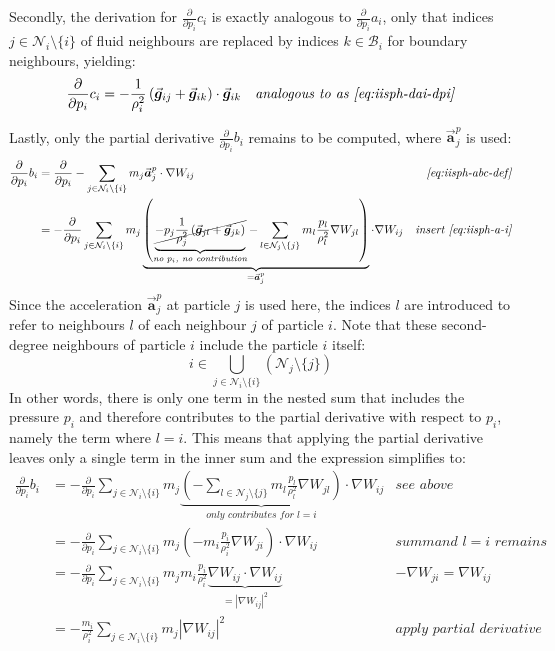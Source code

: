 \documentclass[oneside, a4paper]{book}
\newcommand\abs[1]{\left|#1\right|}
\newcommand\pdpi[0]{\frac{\partial}{\partial p_i}}
\newcommand\vek[1]{\vec{\bm{#1}}}
\newcommand\br[1]{\left(#1\right)}
\begin{document}
    Secondly, the derivation for $\pdpi c_i$ is exactly analogous to $\pdpi  a_i$, only that indices $j\in\mathcal{N}_i\setminus \{i\}$ of fluid neighbours are replaced by indices $k\in\mathcal{B}_i$ for boundary neighbours, yielding:
    \begin{align}
      \pdpi c_i &= -\frac{1}{\rho_i^2} \br{\vek{g}_{ij} +\vek{g}_{ik}} \cdot \vek{g}_{ik} &\textit{analogous to as \autoref{eq:iisph-dai-dpi}}\label{eq:iisph-dci-dpi}
    \end{align}

    Lastly, only the partial derivative $\pdpi b_i$ remains to be computed, where $\vek{a}_j^p$ is used:
    \begin{align*}
      \pdpi b_i &=
      \pdpi - \sum_{j\in\mathcal{N}_i\setminus \{i\}} m_j \vek{a}^p_{j} \cdot \nabla W_{ij} &\textit{\autoref{eq:iisph-abc-def}}\\
      &= -\pdpi \sum_{j\in\mathcal{N}_i\setminus \{i\}} m_j 
      \underbrace{\br{
        \underbrace{\cancel{-p_j \frac{1}{\rho_j^2}\br{
          \vek{g}_{jl}
          +\vek{g}_{jk}
        }}}_{\textit{no $p_i$, no contribution}}
        - \sum_{l\in\mathcal{N}_j\setminus \{j\}} 
        m_l\frac{p_l}{\rho_l^2} \nabla W_{jl} 
      }}_{=\vek{a}_j^p} \cdot \nabla W_{ij} &\textit{insert \autoref{eq:iisph-a-i}}
    \end{align*}
    Since the acceleration $\vek{a}_j^p$ at particle $j$ is used here, the indices $l$ are introduced to refer to neighbours $l$ of each neighbour $j$ of particle $i$. Note that these second-degree neighbours of particle $i$ include the particle $i$ itself:
    \begin{equation}
      i \in \bigcup_{j\in\mathcal{N}_i\setminus\{i\}}\br{\mathcal{N}_j \setminus \{j\}  }
    \end{equation} 
    In other words, there is only one term in the nested sum that includes the pressure $p_i$ and therefore contributes to the partial derivative with respect to $p_i$, namely the term where $l=i$. This means that applying the partial derivative leaves only a single term in the inner sum and the expression simplifies to:
    \begin{align}
      \pdpi b_i &= -\pdpi \sum_{j\in\mathcal{N}_i\setminus \{i\}} m_j \underbrace{\br{
        - \sum_{l\in\mathcal{N}_j\setminus \{j\}} 
        m_l\frac{p_l}{\rho_l^2} \nabla W_{jl} 
      }}_{\textit{only contributes for $l=i$}} \cdot \nabla W_{ij} &\textit{see above}\\
      &= -\pdpi \sum_{j\in\mathcal{N}_i\setminus \{i\}} m_j \br{
        - m_i\frac{p_i}{\rho_i^2} \nabla W_{ji} 
      } \cdot \nabla W_{ij} 
      &\textit{summand $l=i$ remains}\\
      &=- \pdpi \sum_{j\in\mathcal{N}_i\setminus \{i\}} m_j m_i 
        \frac{p_i}{\rho_i^2} 
        \underbrace{\nabla W_{ij} \cdot \nabla W_{ij}}_{=\abs{\nabla W_{ij}}^2}
         &\textit{$-\nabla W_{ji}=\nabla W_{ij}$}\\
      &= -\frac{m_i}{\rho_i^2} \sum_{j\in\mathcal{N}_i\setminus \{i\}} m_j  \abs{\nabla W_{ij}}^2 &\textit{apply partial derivative}
    \end{align}
\end{document}
